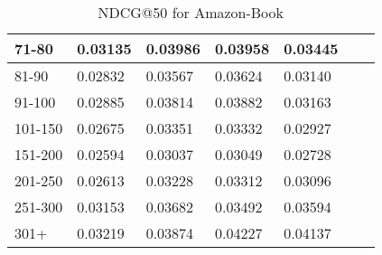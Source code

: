 \begin{table*}[]
\begin{tabular}{|l|l|l|l|l|l|l|}
        71-80   & 0.03135                        & 0.03986                        & 0.03958                        & 0.03445                        &                                &                                \\ \hline
        81-90   & 0.02832                        & 0.03567                        & 0.03624                        & 0.03140                        &                                &                                \\ \hline
        91-100  & 0.02885                        & 0.03814                        & 0.03882                        & 0.03163                        &                                &                                \\ \hline
        101-150 & 0.02675                        & 0.03351                        & 0.03332                        & 0.02927                        &                                &                                \\ \hline
        151-200 & 0.02594                        & 0.03037                        & 0.03049                        & 0.02728                        &                                &                                \\ \hline
        201-250 & 0.02613                        & 0.03228                        & 0.03312                        & 0.03096                        &                                &                                \\ \hline
        251-300 & 0.03153                        & 0.03682                        & 0.03492                        & 0.03594                        &                                &                                \\ \hline
        301+    & 0.03219                        & 0.03874                        & 0.04227                        & 0.04137                        &                                &                                \\ \hline
    \end{tabular}
    \caption{NDCG@50 for Amazon-Book}
\end{table*}
